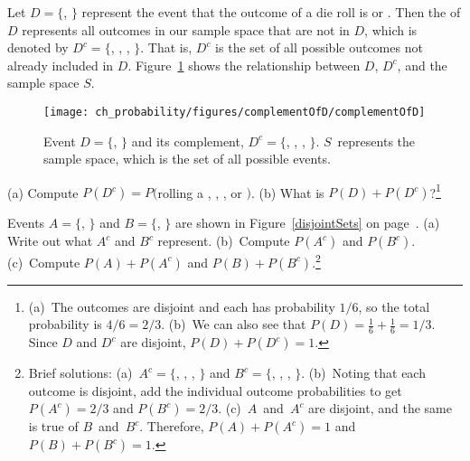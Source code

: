 Let $D=\{$, $\}$ represent the event that the outcome of a die roll is  or . Then the  of $D$ represents all outcomes in our sample space that are not in $D$, which is denoted by $D^c = \{$, , , $\}$. That is, $D^c$ is the set of all possible outcomes not already included in $D$. Figure~\ref{complementOfD} shows the relationship between $D$, $D^c$, and the sample space $S$.

\begin{figure}[hht]
\centering
\texttt{[image: ch\_probability/figures/complementOfD/complementOfD]}
\caption{Event $D=\{$, $\}$ and its complement, $D^c = \{$, , , $\}$. $S$~represents the sample space, which is the set of all possible events.}
\label{complementOfD}

\end{figure}

\begin{exercise}
(a) Compute $P(D^c) = P($rolling a , , , or $)$. (b) What is $P(D) + P(D^c)$?\footnote{(a)~The outcomes are disjoint and each has probability $1/6$, so the total probability is $4/6=2/3$. (b)~We can also see that $P(D)=\frac{1}{6} + \frac{1}{6} = 1/3$. Since $D$ and $D^c$ are disjoint, $P(D) + P(D^c) = 1$.}
\end{exercise}

\begin{exercise}
Events $A=\{$, $\}$ and $B=\{$, $\}$ are shown in Figure~\ref{disjointSets} on page~\pageref{disjointSets}. (a) Write out what $A^c$ and $B^c$ represent. (b)~Compute $P(A^c)$ and $P(B^c)$. (c)~Compute $P(A)+P(A^c)$ and $P(B)+P(B^c)$.\footnote{Brief solutions: (a)~$A^c=\{$, , , $\}$ and $B^c=\{$, , , $\}$. (b)~Noting that each outcome is disjoint, add the individual outcome probabilities to get $P(A^c)=2/3$ and $P(B^c)=2/3$. (c)~$A$~and~$A^c$ are disjoint, and the same is true of $B$~and~$B^c$. Therefore, $P(A) + P(A^c) = 1$ and $P(B) + P(B^c) = 1$.}
\end{exercise}

